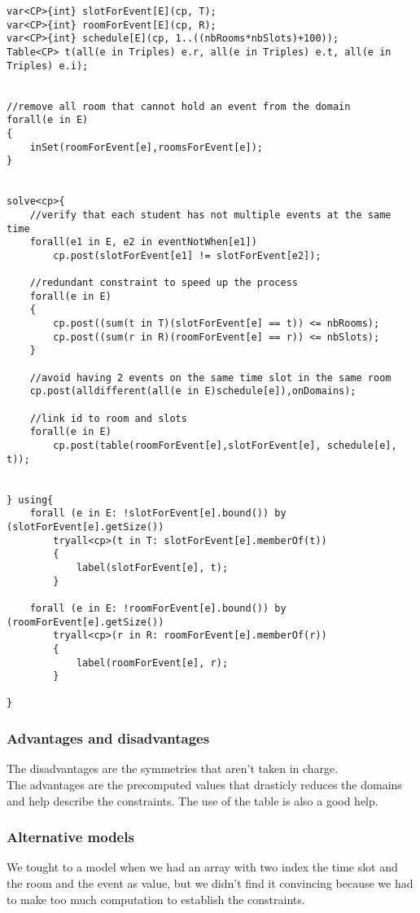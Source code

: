 \documentclass{eplDoc}
\begin{document}
\begin{lstlisting}
var<CP>{int} slotForEvent[E](cp, T);
var<CP>{int} roomForEvent[E](cp, R);
var<CP>{int} schedule[E](cp, 1..((nbRooms*nbSlots)+100));
Table<CP> t(all(e in Triples) e.r, all(e in Triples) e.t, all(e in Triples) e.i);


//remove all room that cannot hold an event from the domain
forall(e in E)
{
    inSet(roomForEvent[e],roomsForEvent[e]);
}


solve<cp>{
    //verify that each student has not multiple events at the same time
    forall(e1 in E, e2 in eventNotWhen[e1])
        cp.post(slotForEvent[e1] != slotForEvent[e2]);

    //redundant constraint to speed up the process
    forall(e in E)
    {
        cp.post((sum(t in T)(slotForEvent[e] == t)) <= nbRooms);
        cp.post((sum(r in R)(roomForEvent[e] == r)) <= nbSlots);
    }

    //avoid having 2 events on the same time slot in the same room
    cp.post(alldifferent(all(e in E)schedule[e]),onDomains);

    //link id to room and slots
    forall(e in E)
        cp.post(table(roomForEvent[e],slotForEvent[e], schedule[e], t));


} using{
    forall (e in E: !slotForEvent[e].bound()) by (slotForEvent[e].getSize())
        tryall<cp>(t in T: slotForEvent[e].memberOf(t))
        {
            label(slotForEvent[e], t);
        }
    
    forall (e in E: !roomForEvent[e].bound()) by (roomForEvent[e].getSize())
        tryall<cp>(r in R: roomForEvent[e].memberOf(r))
        {
            label(roomForEvent[e], r);
        }
    
}
\end{lstlisting}

\subsubsection{Advantages and disadvantages}
The disadvantages are the symmetries that aren't taken in charge. \\
The advantages are the precomputed values that drasticly reduces the domains and help describe the constraints.  The use of the table is also a good help.

\subsubsection{Alternative models}
We tought to a model when we had an array with two index the time slot and the room and the event as value, but we didn't find it convincing because we had to make too much computation to establish the constraints.
\end{document}
